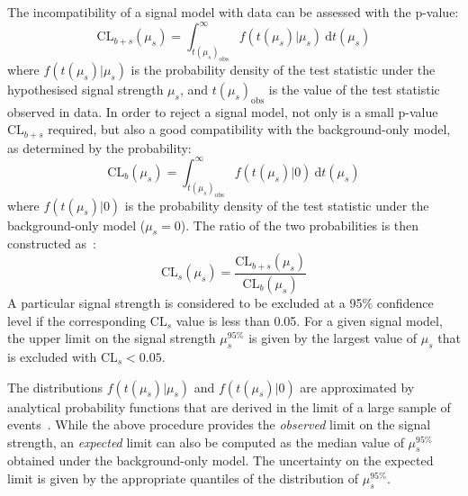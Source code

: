 The incompatibility of a signal model with data can be assessed with the 
p-value:
\begin{equation}
\mathrm{CL}_{b+s}(\mu_s) = \int_{t(\mu_s)_{\mathrm{obs}}}^{\infty} 
f(t(\mu_s)|\mu_s) ~ \mathrm{d}t(\mu_s)
\end{equation}
where $f(t(\mu_s)|\mu_s)$ is the probability density of the test statistic 
under the hypothesised signal strength $\mu_s$, and $t(\mu_s)_{\mathrm{obs}}$ 
is 
the value of the test statistic observed in 
data. In order to reject a signal model, not only is a small p-value 
$\mathrm{CL}_{b+s}$ 
required, but also a good compatibility with the background-only model, as 
determined by the probability:
\begin{equation}
\mathrm{CL}_{b}(\mu_s) = \int_{t(\mu_s)_{\mathrm{obs}}}^{\infty} f(t(\mu_s)|0)~ 
\mathrm{d}t(\mu_s)
\end{equation}
where $f(t(\mu_s)|0)$ is the probability density of the test statistic under 
the background-only model ($\mu_s=0$). The ratio of the two probabilities is 
then constructed as~\cite{cls1,cls2}:
\begin{equation}
\mathrm{CL}_s(\mu_s) = \frac{\mathrm{CL}_{b+s}(\mu_s)}{\mathrm{CL}_{b}(\mu_s)}
\end{equation}
A particular signal strength is considered to be excluded at a 95\% confidence 
level if the corresponding $\mathrm{CL}_s$ value is less than 0.05. For a given 
signal model, the upper limit on the signal strength $\mu_s^{95\%}$ is given by 
the largest value of $\mu_s$ that is excluded with $\mathrm{CL}_s<0.05$. 

The distributions $f(t(\mu_s)|\mu_s)$ and $f(t(\mu_s)|0)$ are approximated by 
analytical probability 
functions that are derived in the limit of a large sample of 
events~\cite{asymptotic-formulae}. 
While the above procedure provides the \textit{observed} limit on the signal 
strength, an \textit{expected} limit can also be computed as the median value 
of $\mu_s^{95\%}$ obtained under the background-only model. The uncertainty on 
the expected limit is given by the appropriate quantiles of the distribution of 
$\mu_s^{95\%}$.


